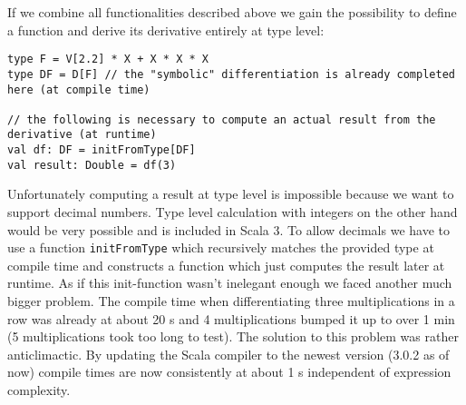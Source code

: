 If we combine all functionalities described above we gain the possibility to define a function and derive its derivative \todowording entirely at type level:
\begin{lstlisting}
type F = V[2.2] * X + X * X * X
type DF = D[F] // the "symbolic" differentiation is already completed here (at compile time)

// the following is necessary to compute an actual result from the derivative (at runtime)
val df: DF = initFromType[DF] 
val result: Double = df(3)
\end{lstlisting}
Unfortunately computing a result at type level is impossible because we want to support decimal numbers. Type level calculation with integers on the other hand would be very possible and is included in Scala 3. To allow decimals we have to use a function \lstinline{initFromType} which recursively matches the provided type at compile time and constructs a function which just computes the result later at runtime. As if this init-function wasn't inelegant enough \todowording we faced another much bigger problem. The compile time when differentiating three multiplications in a row was already at about 20 s and 4 multiplications bumped it up to over 1 min (5 multiplications took too long to test). The solution to this problem was rather anticlimactic. By updating the Scala compiler to the newest version (3.0.2 as of now) compile times are now consistently at about 1 s independent of expression complexity.  
